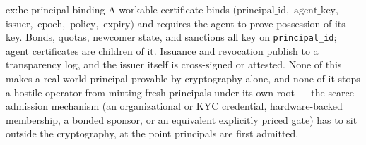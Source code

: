 \documentclass[11pt,a4paper]{article}
\theoremstyle{definition}
\theoremstyle{definition}
\theoremstyle{remark}
\begin{document}
\begin{pdsolution}{ex:he-principal-binding}
A workable certificate binds $(\text{principal\_id},$ $\text{agent\_key},$
$\text{issuer},$ $\text{epoch},$ $\text{policy},$ $\text{expiry})$ and requires the
agent to prove possession of its key. Bonds, quotas, newcomer state, and
sanctions all key on \texttt{principal\_id}; agent certificates are children of
it. Issuance and revocation publish to a transparency log, and the issuer itself
is cross-signed or attested. None of this makes a real-world principal provable
by cryptography alone, and none of it stops a hostile operator from minting
fresh principals under its own root --- the scarce admission mechanism (an
organizational or KYC credential, hardware-backed membership, a bonded sponsor,
or an equivalent explicitly priced gate) has to sit outside the cryptography, at
the point principals are first admitted.
\end{pdsolution}

\end{document}
